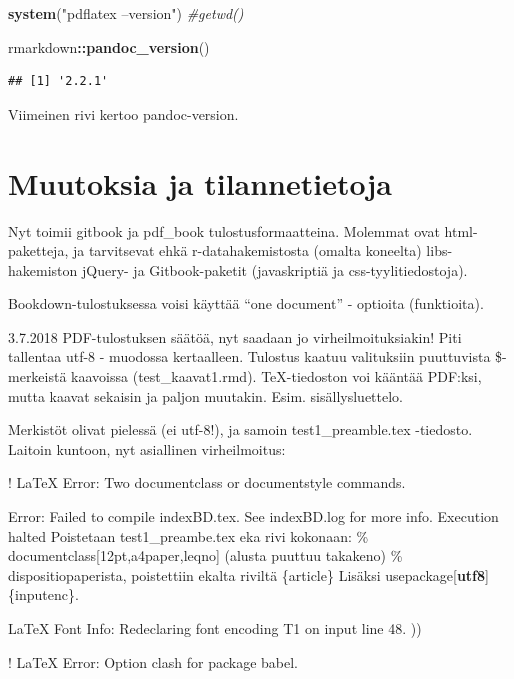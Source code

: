 \documentclass[finnish,]{book}
\newenvironment{Shaded}{\begin{snugshade}}{\end{snugshade}}
\newcommand{\CommentTok}[1]{\textcolor[rgb]{0.56,0.35,0.01}{\textit{#1}}}
\newcommand{\KeywordTok}[1]{\textcolor[rgb]{0.13,0.29,0.53}{\textbf{#1}}}
\newcommand{\NormalTok}[1]{#1}
\newcommand{\OperatorTok}[1]{\textcolor[rgb]{0.81,0.36,0.00}{\textbf{#1}}}
\newcommand{\StringTok}[1]{\textcolor[rgb]{0.31,0.60,0.02}{#1}}
\theoremstyle{definition}
\theoremstyle{definition}
\theoremstyle{definition}
\theoremstyle{remark}
\begin{document}
\begin{Shaded}
\begin{Highlighting}[]
\KeywordTok{system}\NormalTok{(}\StringTok{"pdflatex --version"}\NormalTok{)}
\CommentTok{#getwd()}

\NormalTok{rmarkdown}\OperatorTok{::}\KeywordTok{pandoc_version}\NormalTok{()}
\end{Highlighting}
\end{Shaded}

\begin{verbatim}
## [1] '2.2.1'
\end{verbatim}

Viimeinen rivi kertoo pandoc-version.

\hypertarget{muutoksia-ja-tilannetietoja}{%
\section{Muutoksia ja
tilannetietoja}\label{muutoksia-ja-tilannetietoja}}

Nyt toimii gitbook ja pdf\_book tulostusformaatteina. Molemmat ovat
html-paketteja, ja tarvitsevat ehkä r-datahakemistosta (omalta koneelta)
libs-hakemiston jQuery- ja Gitbook-paketit (javaskriptiä ja
css-tyylitiedostoja).

Bookdown-tulostuksessa voisi käyttää ``one document'' - optioita
(funktioita).

3.7.2018 PDF-tulostuksen säätöä, nyt saadaan jo virheilmoituksiakin!
Piti tallentaa utf-8 - muodossa kertaalleen. Tulostus kaatuu valituksiin
puuttuvista \$-merkeistä kaavoissa (test\_kaavat1.rmd). TeX-tiedoston
voi kääntää PDF:ksi, mutta kaavat sekaisin ja paljon muutakin. Esim.
sisällysluettelo.

Merkistöt olivat pielessä (ei utf-8!), ja samoin test1\_preamble.tex
-tiedosto. Laitoin kuntoon, nyt asiallinen virheilmoitus:

! LaTeX Error: Two documentclass or documentstyle commands.

Error: Failed to compile indexBD.tex. See indexBD.log for more info.
Execution halted Poistetaan test1\_preambe.tex eka rivi kokonaan: \%
documentclass{[}12pt,a4paper,leqno{]} (alusta puuttuu takakeno) \%
dispositiopaperista, poistettiin ekalta riviltä \{article\} Lisäksi
usepackage{[}\textbf{utf8}{]}\{inputenc\}.

LaTeX Font Info: Redeclaring font encoding T1 on input line 48. ))

! LaTeX Error: Option clash for package babel.
\end{document}
